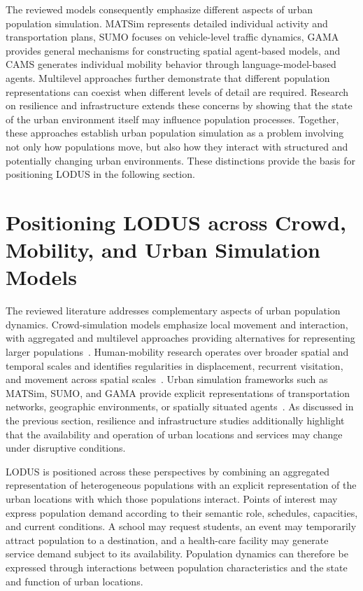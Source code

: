 The reviewed models consequently emphasize different aspects of urban population simulation. MATSim represents detailed individual activity and transportation plans, SUMO focuses on vehicle-level traffic dynamics, GAMA provides general mechanisms for constructing spatial agent-based models, and CAMS generates individual mobility behavior through language-model-based agents. Multilevel approaches further demonstrate that different population representations can coexist when different levels of detail are required. Research on resilience and infrastructure extends these concerns by showing that the state of the urban environment itself may influence population processes. Together, these approaches establish urban population simulation as a problem involving not only how populations move, but also how they interact with structured and potentially changing urban environments. These distinctions provide the basis for positioning LODUS in the following section.

\section{Positioning LODUS across Crowd, Mobility, and Urban Simulation Models}

The reviewed literature addresses complementary aspects of urban population dynamics. Crowd-simulation models emphasize local movement and interaction, with aggregated and multilevel approaches providing alternatives for representing larger populations~\cite{antonitsch2019bioclouds,xiong2010hybrid,serana2023multilevelmodeling}. Human-mobility research operates over broader spatial and temporal scales and identifies regularities in displacement, recurrent visitation, and movement across spatial scales~\cite{brockmann2006scaling,gonzalez2008understanding,natureSong2010exploration,alessandretti2020nature}. Urban simulation frameworks such as MATSim, SUMO, and GAMA provide explicit representations of transportation networks, geographic environments, or spatially situated agents~\cite{balmer2009matsim,krajzewicz2012sumo,taillandier2019gama}. As discussed in the previous section, resilience and infrastructure studies additionally highlight that the availability and operation of urban locations and services may change under disruptive conditions.

LODUS is positioned across these perspectives by combining an aggregated representation of heterogeneous populations with an explicit representation of the urban locations with which those populations interact. Points of interest may express population demand according to their semantic role, schedules, capacities, and current conditions. A school may request students, an event may temporarily attract population to a destination, and a health-care facility may generate service demand subject to its availability. Population dynamics can therefore be expressed through interactions between population characteristics and the state and function of urban locations.


